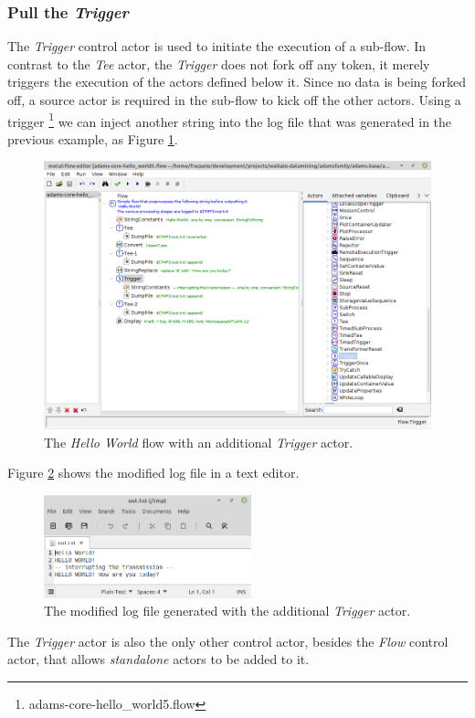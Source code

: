 \subsubsection{Pull the \textit{Trigger}}
The \textit{Trigger} control actor is used to initiate the execution of a
sub-flow. In contrast to the \textit{Tee} actor, the \textit{Trigger} does not
fork off any token, it merely triggers the execution of the actors defined below
it. Since no data is being forked off, a source actor is required in the
sub-flow to kick off the other actors. Using a trigger
\footnote{adams-core-hello\_world5.flow} we can inject another string into the
log file that was generated in the previous example, as Figure \ref{floweditor-helloworld-trigger_flow}.
\begin{figure}[htb]
  \centering
  \includegraphics[width=12.0cm]{images/floweditor-helloworld-trigger_flow.png}
  \caption{The \textit{Hello World} flow with an additional \textit{Trigger}
  actor.}
  \label{floweditor-helloworld-trigger_flow}
\end{figure}
Figure \ref{floweditor-helloworld-trigger_logfile} shows the modified
log file in a text editor.
\begin{figure}[htb]
  \centering
  \includegraphics[width=6.0cm]{images/floweditor-helloworld-trigger_logfile.png}
  \caption{The modified log file generated with the additional \textit{Trigger}
  actor.}
  \label{floweditor-helloworld-trigger_logfile}
\end{figure}
The \textit{Trigger} actor is also the only other control actor, besides the
\textit{Flow} control actor, that allows \textit{standalone} actors to be added
to it.

